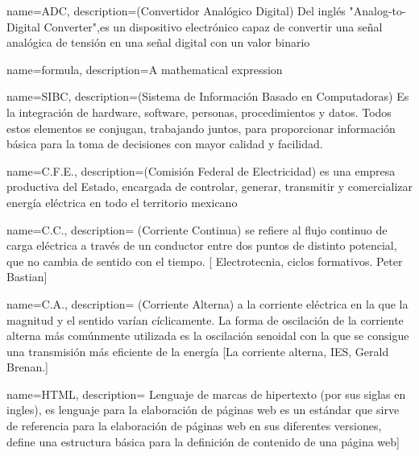 
{
  name=ADC,
  description={(Convertidor Analógico Digital)  Del inglés "Analog-to-Digital Converter",es un dispositivo electrónico capaz de convertir una señal analógica de tensión en una señal digital con un valor binario}
}

{
    name=formula,
    description={A mathematical expression}
}

{
  name=SIBC,
  description={(Sistema de Información Basado en Computadoras) Es la integración de hardware, software, personas, procedimientos y datos. Todos estos elementos se conjugan, trabajando juntos, para proporcionar información básica para la toma de decisiones con mayor calidad y facilidad.  }
}

{
  name=C.F.E.,
  description={(Comisión Federal de Electricidad)  es una empresa productiva del Estado, encargada de controlar, generar, transmitir y comercializar energía eléctrica en todo el territorio mexicano }
}

{
  name=C.C.,
  description={ (Corriente Continua)  se refiere al flujo continuo de carga eléctrica a través de un conductor entre dos puntos de distinto potencial, que no cambia de sentido con el tiempo. [ Electrotecnia, ciclos formativos. Peter Bastian]
}
}

{
  name=C.A.,
  description={ (Corriente Alterna) a la corriente eléctrica en la que la magnitud y el sentido varían cíclicamente. La forma de oscilación de la corriente alterna más comúnmente utilizada es la oscilación senoidal con la que se consigue una transmisión más eficiente de la energía [La corriente alterna, IES, Gerald Brenan.]
}
}

{
  name=HTML,
  description={ Lenguaje de marcas de hipertexto (por sus siglas en ingles), es lenguaje para la elaboración de páginas web es un estándar que sirve de referencia para la elaboración de páginas web en sus diferentes versiones, define una estructura básica para la definición de contenido de una página web]
}
}

